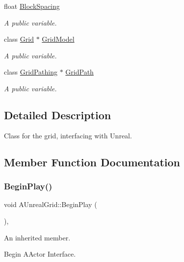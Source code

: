 \begin{DoxyCompactItemize}
float \hyperlink{class_a_unreal_grid_ab7f6c7b674ee42393ddad1a070e94ead}{Block\+Spacing}
\begin{DoxyCompactList}\small\item\em A public variable. \end{DoxyCompactList}\item 
class \hyperlink{class_grid}{Grid} $\ast$ \hyperlink{class_a_unreal_grid_a1bc505d6a6df9d8d57db4d92bf7a0636}{Grid\+Model}
\begin{DoxyCompactList}\small\item\em A public variable. \end{DoxyCompactList}\item 
class \hyperlink{class_grid_pathing}{Grid\+Pathing} $\ast$ \hyperlink{class_a_unreal_grid_a5a108c220c0bfded8c7312aabbbcba82}{Grid\+Path}
\begin{DoxyCompactList}\small\item\em A public variable. \end{DoxyCompactList}\end{DoxyCompactItemize}


\subsection{Detailed Description}
Class for the grid, interfacing with Unreal. 

\subsection{Member Function Documentation}
\hypertarget{class_a_unreal_grid_a9f2e41aff1d7918e7bf46a93432ced89}{}\label{class_a_unreal_grid_a9f2e41aff1d7918e7bf46a93432ced89} 
\subsubsection{\texorpdfstring{Begin\+Play()}{BeginPlay()}}
{\footnotesize\ttfamily void A\+Unreal\+Grid\+::\+Begin\+Play (\begin{DoxyParamCaption}{ }\end{DoxyParamCaption})\hspace{0.3cm}{\ttfamily [override]}, {\ttfamily [virtual]}}



An inherited member. 

Begin A\+Actor Interface. \hypertarget{class_a_unreal_grid_a53493ad37970ddcdf437475740fa73ac}{}\label{class_a_unreal_grid_a53493ad37970ddcdf437475740fa73ac} 
